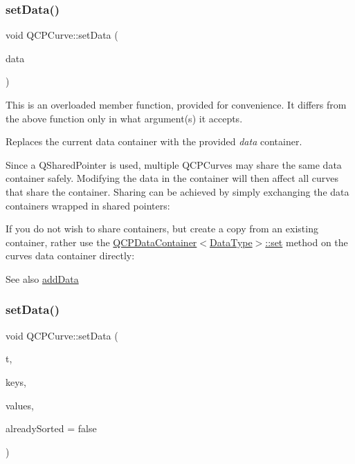 \subsubsection{\texorpdfstring{set\+Data()}{setData()}\hspace{0.1cm}{\footnotesize\ttfamily [1/3]}}
{\footnotesize\ttfamily void Q\+C\+P\+Curve\+::set\+Data (\begin{DoxyParamCaption}\item[{Q\+Shared\+Pointer$<$ \mbox{\hyperlink{class_q_c_p_data_container}{Q\+C\+P\+Curve\+Data\+Container}} $>$}]{data }\end{DoxyParamCaption})}

This is an overloaded member function, provided for convenience. It differs from the above function only in what argument(s) it accepts.

Replaces the current data container with the provided {\itshape data} container.

Since a Q\+Shared\+Pointer is used, multiple Q\+C\+P\+Curves may share the same data container safely. Modifying the data in the container will then affect all curves that share the container. Sharing can be achieved by simply exchanging the data containers wrapped in shared pointers\+: 
\begin{DoxyCodeInclude}
\end{DoxyCodeInclude}
 If you do not wish to share containers, but create a copy from an existing container, rather use the \mbox{\hyperlink{class_q_c_p_data_container_ae7042bd534fc3ce7befa2ce3f790b5bf}{Q\+C\+P\+Data\+Container$<$\+Data\+Type$>$\+::set}} method on the curve\textquotesingle{}s data container directly\+: 
\begin{DoxyCodeInclude}
\end{DoxyCodeInclude}
 \begin{DoxySeeAlso}{See also}
\mbox{\hyperlink{class_q_c_p_curve_a73edf394b94f3f24f07518e30565a07f}{add\+Data}} 
\end{DoxySeeAlso}
\mbox{\label{class_q_c_p_curve_a0768af2c33c8dcffa3cf5bdeb53923a6}} 
\subsubsection{\texorpdfstring{set\+Data()}{setData()}\hspace{0.1cm}{\footnotesize\ttfamily [2/3]}}
{\footnotesize\ttfamily void Q\+C\+P\+Curve\+::set\+Data (\begin{DoxyParamCaption}\item[{const Q\+Vector$<$ double $>$ \&}]{t,  }\item[{const Q\+Vector$<$ double $>$ \&}]{keys,  }\item[{const Q\+Vector$<$ double $>$ \&}]{values,  }\item[{bool}]{already\+Sorted = {\ttfamily false} }\end{DoxyParamCaption})}

